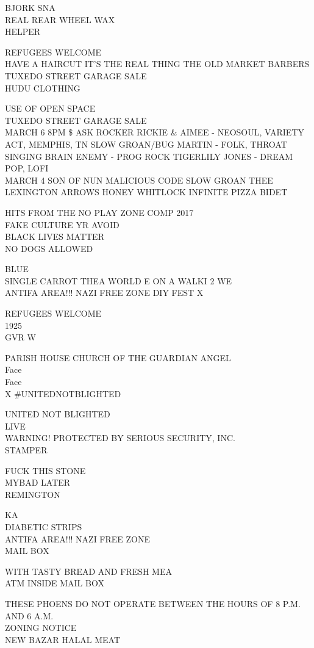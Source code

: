 \documentclass[10pt,letterpaper]{article}
\begin{document}
BJORK SNA\\
REAL REAR WHEEL WAX\\
HELPER

REFUGEES WELCOME\\
HAVE A HAIRCUT IT'S THE REAL THING THE OLD MARKET BARBERS\\
TUXEDO STREET GARAGE SALE\\
HUDU CLOTHING

USE OF OPEN SPACE\\
TUXEDO STREET GARAGE SALE\\
MARCH 6 8PM \$ ASK ROCKER RICKIE \& AIMEE {-} NEOSOUL, VARIETY ACT, MEMPHIS, TN SLOW GROAN/BUG MARTIN {-} FOLK, THROAT SINGING BRAIN ENEMY {-} PROG ROCK TIGERLILY JONES {-} DREAM POP, LOFI\\
MARCH 4 SON OF NUN MALICIOUS CODE SLOW GROAN THEE LEXINGTON ARROWS HONEY WHITLOCK INFINITE PIZZA BIDET

HITS FROM THE NO PLAY ZONE COMP 2017\\
FAKE CULTURE YR AVOID\\
BLACK LIVES MATTER\\
NO DOGS ALLOWED

BLUE\\
SINGLE CARROT THEA WORLD E ON A WALKI 2 WE\\
ANTIFA AREA!!! NAZI FREE ZONE DIY FEST X

REFUGEES WELCOME\\
1925\\
GVR W

PARISH HOUSE CHURCH OF THE GUARDIAN ANGEL\\
Face\\
Face\\
X \#UNITEDNOTBLIGHTED

UNITED NOT BLIGHTED\\
LIVE\\
WARNING!  PROTECTED BY SERIOUS SECURITY, INC.\\
STAMPER

FUCK THIS STONE\\
MYBAD LATER\\
REMINGTON

KA\\
DIABETIC STRIPS\\
ANTIFA AREA!!! NAZI FREE ZONE\\
MAIL BOX

WITH TASTY BREAD AND FRESH MEA\\
ATM INSIDE MAIL BOX

THESE PHOENS DO NOT OPERATE BETWEEN THE HOURS OF 8 P.M. AND 6 A.M.\\
ZONING NOTICE\\
NEW BAZAR HALAL MEAT
\end{document}
